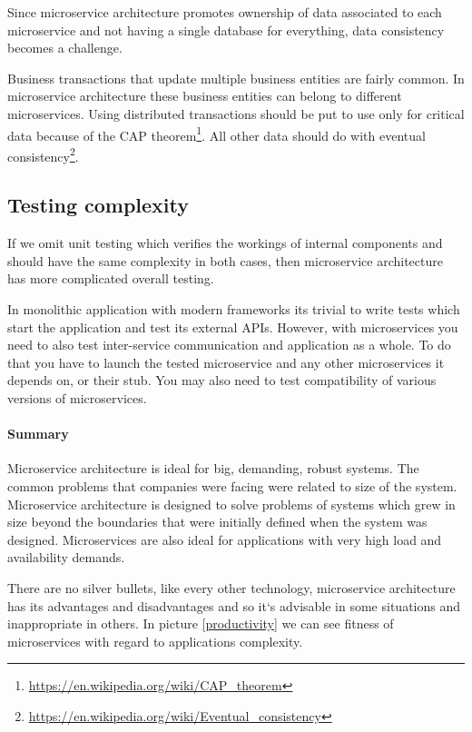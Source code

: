 \documentclass[12pt,oneside]{fithesis2}
\begin{document}
Since microservice architecture promotes ownership of data associated to each microservice and not having a single database for everything, data consistency becomes a challenge.

Business transactions that update multiple business entities are fairly common. In microservice architecture these business entities can belong to different microservices. Using distributed transactions should be put to use only for critical data because of the CAP theorem\footnote{\url{https://en.wikipedia.org/wiki/CAP_theorem}}. All other data should do with eventual consistency\footnote{\url{https://en.wikipedia.org/wiki/Eventual_consistency}}.

\subsection{Testing complexity}

If we omit unit testing which verifies the workings of internal components and should have the same complexity in both cases, then microservice architecture has more complicated overall testing.

In monolithic application with modern frameworks its trivial to write tests which start the application and test its external APIs. However, with microservices you need to also test inter-service communication and application as a whole. To do that you have to launch the tested microservice and any other microservices it depends on, or their stub. You may also need to test compatibility of various versions of microservices.

\paragraph{Summary\newline\newline}

Microservice architecture is ideal for big, demanding, robust systems. The common problems that companies were facing were related to size of the system. Microservice architecture is designed to solve problems of systems which grew in size beyond the boundaries that were initially defined when the system was designed. Microservices are also ideal for applications with very high load and availability demands.

There are no silver bullets, like every other technology, microservice architecture has its advantages and disadvantages and so it`s advisable in some situations and inappropriate in others. In picture \ref{productivity} we can see fitness of microservices with regard to applications complexity.
\end{document}
